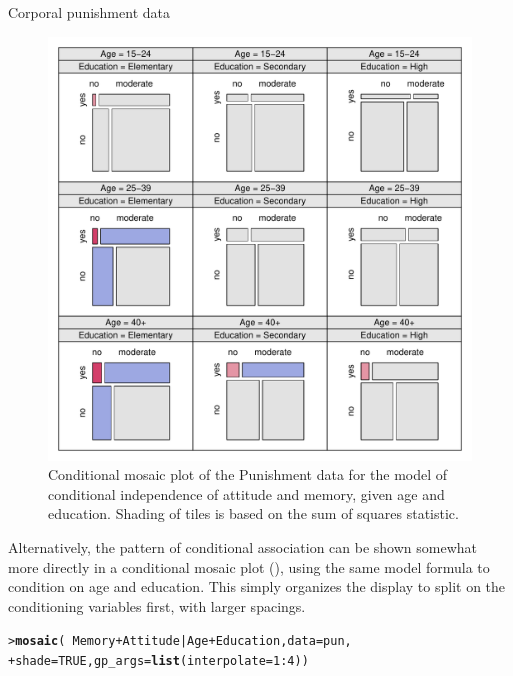 \documentclass[10pt,krantz2]{krantz}\usepackage[]{graphicx}\usepackage[]{color}
\makeatletter
\newcommand{\hlnum}[1]{\textcolor[rgb]{0.686,0.059,0.569}{#1}}%
\newcommand{\hlopt}[1]{\textcolor[rgb]{0,0,0}{#1}}%
\newcommand{\hlstd}[1]{\textcolor[rgb]{0.345,0.345,0.345}{#1}}%
\newcommand{\hlkwc}[1]{\textcolor[rgb]{0.333,0.667,0.333}{#1}}%
\newcommand{\hlkwd}[1]{\textcolor[rgb]{0.737,0.353,0.396}{\textbf{#1}}}%
\newenvironment{kframe}{%
 \def\at@end@of@kframe{}%
 \ifinner\ifhmode%
  \def\at@end@of@kframe{\end{minipage}}%
  \begin{minipage}{\columnwidth}%
 \fi\fi%
 \def\FrameCommand##1{\hskip\@totalleftmargin \hskip-\fboxsep
 \colorbox{shadecolor}{##1}\hskip-\fboxsep
     \hskip-\linewidth \hskip-\@totalleftmargin \hskip\columnwidth}%
 \MakeFramed {\advance\hsize-\width
   \@totalleftmargin\z@ \linewidth\hsize
   \@setminipage}}%
 {\par\unskip\endMakeFramed%
 \at@end@of@kframe}
\newenvironment{knitrout}{}{} %
\renewenvironment{knitrout}{\small\renewcommand{\baselinestretch}{.85}}{} %
\makeatother
\begin{document}
\begin{Example}[punish]{Corporal punishment data}
\begin{knitrout}
\begin{figure}[!htb]
\centerline{\includegraphics[width=.95\textwidth]{ch05/fig/punish-cond1-1} }

\caption[Conditional mosaic plot of the Punishment data for the model of conditional independence of attitude and memory, given age and education]{Conditional mosaic plot of the Punishment data for the model of conditional independence of attitude and memory, given age and education. Shading of tiles is based on the sum of squares statistic.}\label{fig:punish-cond1}
\end{figure}


\end{knitrout}

Alternatively, the pattern of conditional association can be shown somewhat more directly
in a conditional mosaic plot (), using the same model formula to condition on
age and education. This simply organizes the display to split on the conditioning
variables first, with larger spacings.
\begin{knitrout}
\color{fgcolor}\begin{kframe}
\begin{alltt}
\hlstd{> }\hlkwd{mosaic}\hlstd{(}\hlopt{~} \hlstd{Memory} \hlopt{+} \hlstd{Attitude} \hlopt{|} \hlstd{Age} \hlopt{+} \hlstd{Education,} \hlkwc{data} \hlstd{= pun,}
\hlstd{+ }       \hlkwc{shade} \hlstd{=} \hlnum{TRUE}\hlstd{,} \hlkwc{gp_args} \hlstd{=} \hlkwd{list}\hlstd{(}\hlkwc{interpolate} \hlstd{=} \hlnum{1} \hlopt{:} \hlnum{4}\hlstd{))}
\end{alltt}
\end{kframe}\begin{figure}[!htb]


\end{figure}
\end{knitrout}
\end{Example}
\end{document}

